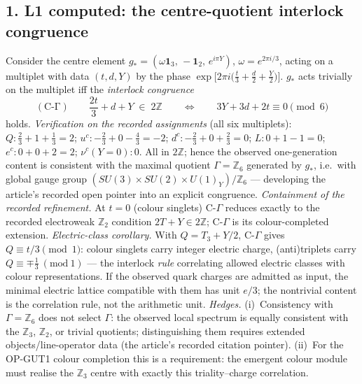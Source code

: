 \subsection*{1. L1 computed: the centre-quotient interlock
congruence}
Consider the centre element
$g_*=(\omega\mathbf 1_3,\,-\mathbf 1_2,\,e^{i\pi Y})$,
$\omega=e^{2\pi i/3}$, acting on a multiplet with data $(t,d,Y)$
by the phase $\exp\!\bigl[2\pi i\bigl(\tfrac t3+\tfrac d2
+\tfrac Y2\bigr)\bigr]$.
$g_*$ acts trivially on the multiplet iff the
\emph{interlock congruence}
\[
\mathrm{(C\mbox{-}\Gamma)}\qquad
\frac{2t}{3}+d+Y\;\in\;2\mathbb Z
\qquad\Longleftrightarrow\qquad
3Y+3d+2t\equiv0 \pmod 6
\]
holds.
\emph{Verification on the recorded assignments} (all six
multiplets): $Q:\tfrac23+1+\tfrac13=2$;
$u^c:-\tfrac23+0-\tfrac43=-2$; $d^c:-\tfrac23+0+\tfrac23=0$;
$L:0+1-1=0$; $e^c:0+0+2=2$; $\nu^c(Y=0):0$.
All in $2\mathbb Z$; hence the observed one-generation content is
consistent with the maximal quotient $\Gamma=\mathbb Z_6$
generated by $g_*$, i.e.\ with global gauge group
$(SU(3)\times SU(2)\times U(1)_Y)/\mathbb Z_6$ --- developing the
article's recorded open pointer into an explicit congruence.
\emph{Containment of the recorded refinement.}
At $t=0$ (colour singlets) C-$\Gamma$ reduces exactly to the
recorded electroweak $\mathbb Z_2$ condition $2T+Y\in2\mathbb Z$;
C-$\Gamma$ is its colour-completed extension.
\emph{Electric-class corollary.}
With $Q=T_3+Y/2$, C-$\Gamma$ gives $Q\equiv t/3\pmod 1$: colour
singlets carry integer electric charge, (anti)triplets carry
$Q\equiv\mp\tfrac13\ (\mathrm{mod}\ 1)$ --- the
interlock \emph{rule} correlating allowed electric classes with
colour representations.
If the observed quark charges are admitted as input, the minimal
electric lattice compatible with them has unit $e/3$; the
nontrivial content is the correlation rule, not the arithmetic
unit.
\emph{Hedges.}
(i)~Consistency with $\Gamma=\mathbb Z_6$ does not select
$\Gamma$: the observed local spectrum is equally consistent with
the $\mathbb Z_3$, $\mathbb Z_2$, or trivial quotients;
distinguishing them requires extended objects/line-operator data
(the article's recorded citation pointer).
(ii)~For the OP-GUT1 colour completion this is a requirement: the
emergent colour module must realise the $\mathbb Z_3$ centre with
exactly this triality--charge correlation.


